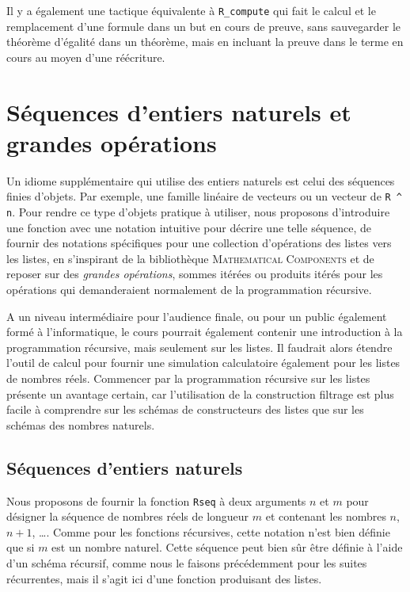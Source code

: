 \documentclass{modjflart}
\newcommand{\mathcomp}{\textsc{Mathematical Components}}
\begin{document}
Il y a également une tactique équivalente à \texttt{R\_compute} qui fait
le calcul et le remplacement d'une formule dans un but en cours de
preuve, sans sauvegarder le théorème d'égalité dans un théorème, mais
en incluant la preuve dans le terme en cours au moyen d'une réécriture.

\section{Séquences d'entiers naturels et grandes opérations}
Un idiome supplémentaire qui utilise des entiers naturels est celui
des séquences finies d'objets.  Par exemple, une famille linéaire de
vecteurs ou un vecteur de \texttt{R \^{ } n}.  Pour rendre ce type d'objets
pratique à utiliser, nous proposons d'introduire une fonction avec
une notation intuitive pour décrire une telle séquence, de fournir
des notations spécifiques pour une collection d'opérations des listes
vers les listes, en s'inspirant de la bibliothèque \mathcomp{}
\cite{MahboubiTassi2022} et
de reposer sur des {\em grandes opérations}, sommes itérées ou
produits itérés pour les opérations qui demanderaient normalement de
la programmation récursive.

A un niveau intermédiaire pour l'audience finale, ou pour un public
également formé à l'informatique, le cours pourrait également contenir
une introduction à la programmation récursive, mais seulement sur les
listes.  Il faudrait alors étendre l'outil de calcul pour fournir une
simulation calculatoire également pour les listes de nombres réels.
Commencer par la programmation récursive sur les listes présente un
avantage certain, car l'utilisation de la construction filtrage est
plus facile à comprendre sur les schémas de constructeurs des listes
que sur les schémas des nombres naturels.

\subsection{Séquences d'entiers naturels}
Nous proposons de fournir la fonction \texttt{Rseq} à deux arguments
\(n\) et \(m\)
pour désigner la séquence de nombres réels de longueur \(m\) et
contenant les nombres \(n\), \(n + 1\), \dots.
Comme pour les fonctions récursives, cette notation
n'est bien définie que si \(m\) est un nombre naturel.  Cette séquence
peut bien sûr être définie à l'aide d'un schéma récursif, comme nous le
faisons précédemment pour les suites récurrentes, mais il s'agit ici
d'une fonction produisant des listes.
\end{document}
